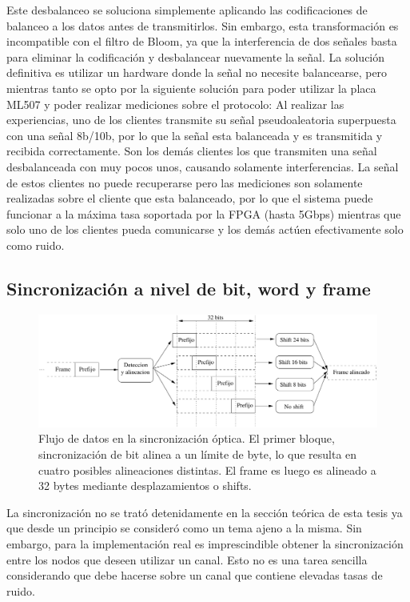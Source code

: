 Este desbalanceo se soluciona simplemente aplicando las codificaciones de balanceo a los datos antes de transmitirlos. Sin embargo, esta transformación es incompatible con el filtro de Bloom, ya que la interferencia de dos señales basta para eliminar la codificación y desbalancear nuevamente la señal. La solución definitiva es utilizar un hardware donde la señal no necesite balancearse, pero mientras tanto se opto por la siguiente solución para poder utilizar la placa ML507 y poder realizar mediciones sobre el protocolo: Al realizar las experiencias, uno de los clientes transmite su señal pseudoaleatoria superpuesta con una señal 8b/10b, por lo que la señal esta balanceada y es transmitida y recibida correctamente. Son los demás clientes los que transmiten una señal desbalanceada con muy pocos unos, causando solamente interferencias. La señal de estos clientes no puede recuperarse pero las mediciones son solamente realizadas sobre el cliente que esta balanceado, por lo que el sistema puede funcionar a la máxima tasa soportada por la FPGA (hasta 5Gbps) mientras que solo uno de los clientes pueda comunicarse y los demás actúen efectivamente solo como ruido.

\subsection{Sincronización a nivel de bit, word y frame}

\begin{figure}[t]
  \centering
    \includegraphics[width=6in]{graphs/optsync.pdf}
\caption {Flujo de datos en la sincronización óptica. El primer bloque, sincronización de bit alinea a un límite de byte, lo que resulta en cuatro posibles alineaciones distintas. El frame es luego es alineado a 32 bytes mediante desplazamientos o shifts.}
\label{fig:optsync}
\end{figure}


La sincronización no se trató detenidamente en la sección teórica de esta tesis ya que desde un principio se consideró como un tema ajeno a la misma. Sin embargo, para la implementación real es imprescindible obtener la sincronización entre los nodos que deseen utilizar un canal. Esto no es una tarea sencilla considerando que debe hacerse sobre un canal que contiene elevadas tasas de ruido.

